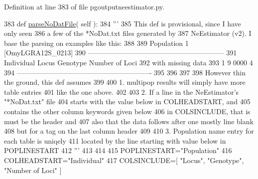 Definition at line 383 of file pgoutputneestimator.\+py.


\begin{DoxyCode}
383     \textcolor{keyword}{def }\hyperlink{classnegui_1_1pgoutputneestimator_1_1PGOutputNeEstimator_a4f8192c2aacf6e38b2c4c1d80302b643}{parseNoDatFile}( self ):
384         \textcolor{stringliteral}{'''}
385 \textcolor{stringliteral}{        This def is provisional, since I have only seen}
386 \textcolor{stringliteral}{        a few of the *NoDat.txt files generated by}
387 \textcolor{stringliteral}{        NeEstimator (v2). I base the parsing on examples like this:}
388 \textcolor{stringliteral}{}
389 \textcolor{stringliteral}{        Population 1 [OmyLGRA12S\_0213]  }
390 \textcolor{stringliteral}{        -----------------------------------------------------------}
391 \textcolor{stringliteral}{        Individual       Locus         Genotype     Number of Loci}
392 \textcolor{stringliteral}{                                          with missing data}
393 \textcolor{stringliteral}{               1            9             0000             4   }
394 \textcolor{stringliteral}{        ----------------------------------------------------------  }
395 \textcolor{stringliteral}{        }
396 \textcolor{stringliteral}{    }
397 \textcolor{stringliteral}{        }
398 \textcolor{stringliteral}{        However thin the ground, this def assumes}
399 \textcolor{stringliteral}{}
400 \textcolor{stringliteral}{        1. multipop results will simply have more table entries}
401 \textcolor{stringliteral}{        like the one above.}
402 \textcolor{stringliteral}{}
403 \textcolor{stringliteral}{        2. If a line in the NeEstimator's "*NoDat.txt" file}
404 \textcolor{stringliteral}{        starts with the value below in COLHEADSTART, and }
405 \textcolor{stringliteral}{        contains the other column keywords given below}
406 \textcolor{stringliteral}{        in COLSINCLUDE, that is must be the header and}
407 \textcolor{stringliteral}{        also that the data follows after one mostly line blank}
408 \textcolor{stringliteral}{        but for a tag on the last column header}
409 \textcolor{stringliteral}{}
410 \textcolor{stringliteral}{        3. Population name entry for each table is uniqely}
411 \textcolor{stringliteral}{        located by the line starting with value below in POPLINESTART}
412 \textcolor{stringliteral}{        '''}
413 
414 
415         POPLINESTART=\textcolor{stringliteral}{"Population"}
416         COLHEADSTART=\textcolor{stringliteral}{"Individual"}       
417         COLSINCLUDE=[ \textcolor{stringliteral}{"Locus"}, \textcolor{stringliteral}{"Genotype"}, \textcolor{stringliteral}{"Number of Loci"} ]

\end{DoxyCode}
